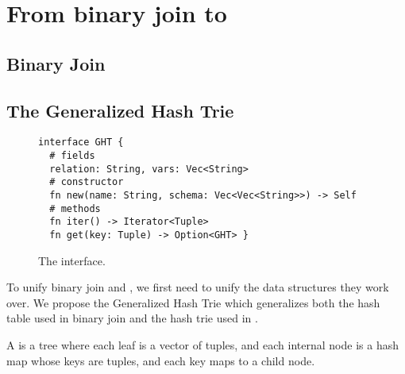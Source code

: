 \section{From binary join to \FJ}\label{sec:free-join}

\subsection{Binary Join}




\subsection{The Generalized Hash Trie}\label{sec:ght}

\begin{figure}
  \begin{lstlisting}
interface GHT {
  # fields
  relation: String, vars: Vec<String>  
  # constructor
  fn new(name: String, schema: Vec<Vec<String>>) -> Self
  # methods
  fn iter() -> Iterator<Tuple>
  fn get(key: Tuple) -> Option<GHT> }
\end{lstlisting}
  \caption{The \GHT interface.}
  \label{fig:ght}
\end{figure}

To unify binary join and \GJ,
we first need to unify the data structures they work over.
We propose the Generalized Hash Trie
which generalizes both the hash table used in binary join
and the hash trie used in \GJ.

\begin{definition}
  A \GHT is a tree where each leaf is a vector of tuples, and
  each internal node is a hash map whose keys are tuples, and each key
  maps to a child node.
\end{definition}


